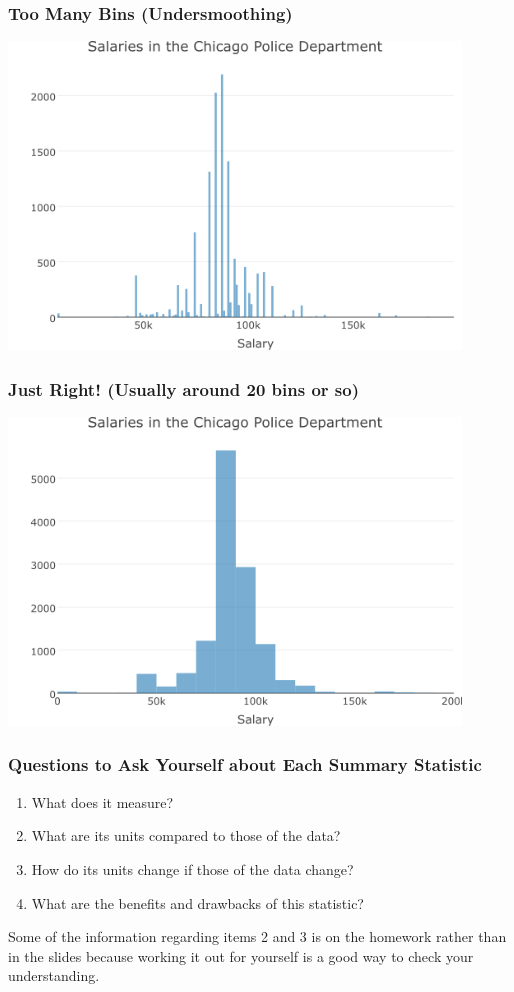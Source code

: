 \documentclass{beamer}
\begin{document}
\begin{frame}
\frametitle{Too Many Bins (Undersmoothing)}
	\centering
	\includegraphics[width = 0.9\textwidth]{./images/histogramMany.png}
\end{frame}

\begin{frame}
\frametitle{Just Right! (Usually around 20 bins or so)}
	\centering
	\includegraphics[width = 0.9\textwidth]{./images/histogramRight.png}
\end{frame}

\begin{frame}
\frametitle{Questions to Ask Yourself about Each Summary Statistic}
	\begin{enumerate}
		\item What does it measure?
		\item What are its units compared to those of the data?
		\item How do its units change if those of the data change?
		\item What are the benefits and drawbacks of this statistic?
	\end{enumerate}
	\vspace{2em}
	\alert{Some of the information regarding items 2 and 3 is on the homework rather than in the 		slides because working it out for yourself is a good way to check your understanding.}
\end{frame}
\end{document}
